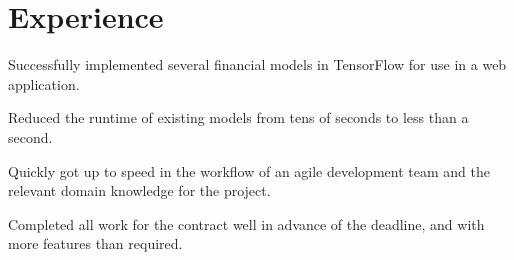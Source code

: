 \documentclass[]{deedy-resume-openfont}
\begin{document}
\hfill
\begin{minipage}[t]{0.66\textwidth} 


\section{Experience}
\vspace{\topsep}
\begin{tightemize}
\item Successfully implemented several financial models in TensorFlow for use in a web application.
\item Reduced the runtime of existing models from tens of seconds to less than a second.
\item Quickly got up to speed in the workflow of an agile development team and the relevant domain knowledge for the project.
\item Completed all work for the contract well in advance of the deadline, and with more features than required.
\end{tightemize}
  

\end{minipage}
\end{document}
